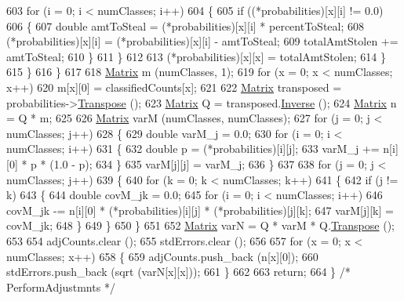 \begin{DoxyCode}
603         \textcolor{keywordflow}{for} (i = 0;  i < numClasses;  i++)
604         \{
605           \textcolor{keywordflow}{if}  ((*probabilities)[x][i] != 0.0)
606           \{
607             \textcolor{keywordtype}{double} amtToSteal = (*probabilities)[x][i] * percentToSteal;
608             (*probabilities)[x][i] = (*probabilities)[x][i] - amtToSteal;
609             totalAmtStolen += amtToSteal;
610           \}
611         \}
612 
613         (*probabilities)[x][x] = totalAmtStolen;
614       \}
615     \}
616   \}
617 
618   \hyperlink{class_k_k_b_1_1_matrix}{Matrix}  m (numClasses, 1);
619   \textcolor{keywordflow}{for}  (x = 0;  x < numClasses;  x++)
620     m[x][0] = classifiedCounts[x];
621 
622   \hyperlink{class_k_k_b_1_1_matrix}{Matrix}  transposed = probabilities->\hyperlink{class_k_k_b_1_1_matrix_af9b74b284027c584dc75ae674e65f58d}{Transpose} ();
623   \hyperlink{class_k_k_b_1_1_matrix}{Matrix}  Q = transposed.\hyperlink{class_k_k_b_1_1_matrix_ac1e575ac083839c44cd50f56e627a320}{Inverse} ();
624   \hyperlink{class_k_k_b_1_1_matrix}{Matrix}  n = Q * m;
625 
626   \hyperlink{class_k_k_b_1_1_matrix}{Matrix}  varM (numClasses, numClasses);
627   \textcolor{keywordflow}{for}  (j = 0;  j < numClasses;  j++)
628   \{
629     \textcolor{keywordtype}{double}  varM\_j = 0.0;
630     \textcolor{keywordflow}{for}  (i = 0;  i < numClasses;  i++)
631     \{
632       \textcolor{keywordtype}{double}  p = (*probabilities)[i][j];
633       varM\_j += n[i][0] * p * (1.0 - p);
634     \}
635     varM[j][j] = varM\_j;
636   \}
637 
638   \textcolor{keywordflow}{for} (j = 0;  j < numClasses;  j++)
639   \{
640     \textcolor{keywordflow}{for}  (k = 0;  k < numClasses;  k++)
641     \{
642       \textcolor{keywordflow}{if}  (j != k)
643       \{
644         \textcolor{keywordtype}{double}  covM\_jk = 0.0;
645         \textcolor{keywordflow}{for}  (i = 0;  i < numClasses;  i++)
646           covM\_jk -= n[i][0] * (*probabilities)[i][j] * (*probabilities)[j][k];
647         varM[j][k] = covM\_jk;
648       \}
649     \}
650   \}
651 
652   \hyperlink{class_k_k_b_1_1_matrix}{Matrix}  varN = Q * varM * Q.\hyperlink{class_k_k_b_1_1_matrix_af9b74b284027c584dc75ae674e65f58d}{Transpose} ();
653 
654   adjCounts.clear ();
655   stdErrors.clear ();
656     
657   \textcolor{keywordflow}{for}  (x = 0;  x < numClasses;  x++)
658   \{
659     adjCounts.push\_back (n[x][0]);
660     stdErrors.push\_back (sqrt (varN[x][x]));
661   \}
662 
663   \textcolor{keywordflow}{return};
664 \}  \textcolor{comment}{/* PerformAdjustmnts */}
\end{DoxyCode}
